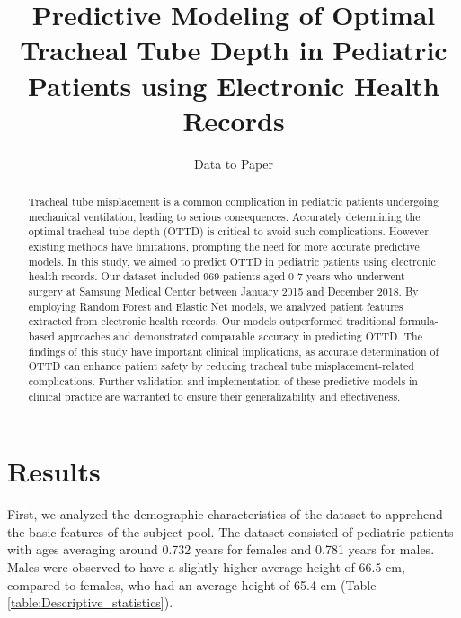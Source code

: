 \documentclass[11pt]{article}
\title{Predictive Modeling of Optimal Tracheal Tube Depth in Pediatric Patients using Electronic Health Records}
\author{Data to Paper}
\begin{document}
\maketitle
\begin{abstract}
Tracheal tube misplacement is a common complication in pediatric patients undergoing mechanical ventilation, leading to serious consequences. Accurately determining the optimal tracheal tube depth (OTTD) is critical to avoid such complications. However, existing methods have limitations, prompting the need for more accurate predictive models. In this study, we aimed to predict OTTD in pediatric patients using electronic health records. Our dataset included 969 patients aged 0-7 years who underwent surgery at Samsung Medical Center between January 2015 and December 2018. By employing Random Forest and Elastic Net models, we analyzed patient features extracted from electronic health records. Our models outperformed traditional formula-based approaches and demonstrated comparable accuracy in predicting OTTD. The findings of this study have important clinical implications, as accurate determination of OTTD can enhance patient safety by reducing tracheal tube misplacement-related complications. Further validation and implementation of these predictive models in clinical practice are warranted to ensure their generalizability and effectiveness.
\end{abstract}
\section*{Results}

First, we analyzed the demographic characteristics of the dataset to apprehend the basic features of the subject pool. The dataset consisted of pediatric patients with ages averaging around 0.732 years for females and 0.781 years for males. Males were observed to have a slightly higher average height of 66.5 cm, compared to females, who had an average height of 65.4 cm (Table \ref{table:Descriptive_statistics}).

\begin{table}[h]
\caption{Descriptive statistics of Height and Age stratified by Sex}
\label{table:Descriptive_statistics}
\begin{threeparttable}
\renewcommand{\TPTminimum}{\linewidth}
\begin{tablenotes}
\footnotesize
\item 
\end{tablenotes}
\end{threeparttable}
\end{table}
\end{document}
